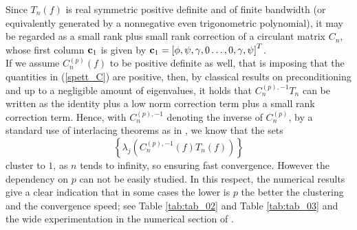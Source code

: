 \documentclass{article}
\begin{document}
Since $ T_{ n } \left( f \right) $ is real symmetric positive definite and of finite bandwidth (or equivalently generated by a nonnegative even trigonometric polynomial), it may be regarded as a small rank plus small rank correction of a circulant matrix $ C_{ n }$, whose first column
${\bf c}_1$  is given by $ {\bf c}_1 = \left[ \phi, \psi, \gamma, 0 \dots, 0, \gamma, \psi \right]^{ T } $. \\
If we assume $ C_{ n }^{ \left( p \right) }(f) $ to be positive definite as well, that is imposing that the quantities in (\ref{spett_C}) are positive, then, by classical results on preconditioning \cite{CN-Sirev,Koro1} and up to a negligible amount of eigenvalues, it holds that $C_{ n }^{ \left( p \right), -1 } T_{ n }$ can be written as the identity plus a low norm correction term plus a small rank correction term. Hence, with $ C_{ n }^{ \left( p \right), -1 } $ denoting the inverse of $ C_{ n }^{ \left( p \right) } $, by a standard use of interlacing theorems as in
\cite{Bhatia,GLT-bookI}, we know that the sets
\begin{equation*}
	\left\{\lambda_{ j } \left( C_{ n }^{ \left( p \right), -1 }(f) T_{ n }(f) \right) \right\}
\end{equation*}
cluster to $1$, as $n$ tends to infinity, so ensuring fast convergence. However the dependency on $p$ can not be easily studied. In this respect, the numerical results give a clear indication that in some cases the lower is $p$ the better the clustering and the convergence speed;
see Table  \ref{tab:tab_02} and Table \ref{tab:tab_03} and the wide experimentation in the numerical section of \cite{beyond}.
\end{document}
